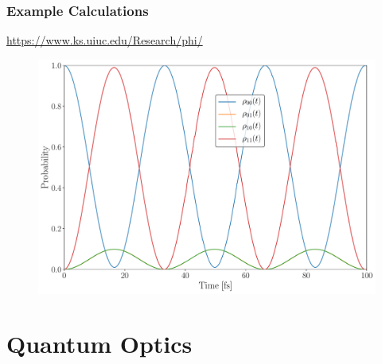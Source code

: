\documentclass[9pt]{report}
\begin{document}
\subsection{Example Calculations}
\url{https://www.ks.uiuc.edu/Research/phi/}
\begin{figure}[H]
	\centering
	\includegraphics[width=15cm]{Special_Pair_1.pdf}
\end{figure}

























































\chapter{Quantum Optics}
\end{document}
